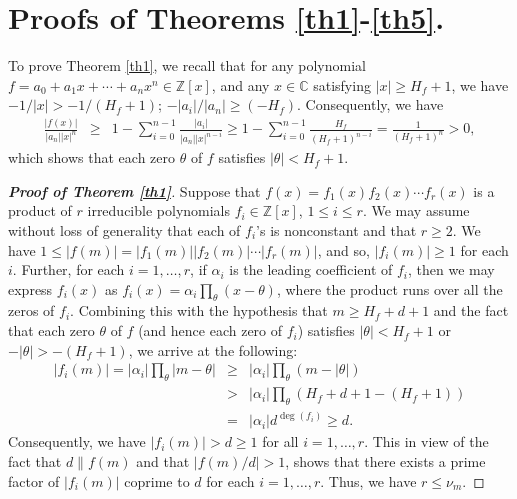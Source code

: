\documentclass[12pt,reqno]{amsart}%
\begin{document}
\section{Proofs of Theorems \ref{th1}-\ref{th5}.}\label{sec:2}
To prove Theorem \ref{th1}, we recall that for any polynomial $f=a_0+a_1x+\cdots +a_nx^n\in \mathbb Z[x]$, and
any $x\in \mathbb{C}$ satisfying $|x|\geq H_f+1$, we have $-1/|x|>-1/(H_f+1)$; $-|a_i|/|a_n|\geq (-H_f)$. Consequently, we have \begin{eqnarray*}
\frac{|f(x)|}{|a_n||x|^n} &\geq &1-\sum_{i=0}^{n-1}\frac{|a_i|}{|a_n||x|^{n-i}}\geq  1-\sum_{i=0}^{n-1}\frac{H_f}{(H_f+1)^{n-i}}=\frac{1}{(H_f+1)^{n}}>0,
\end{eqnarray*}
which shows that each zero $\theta$ of $f$ satisfies $|\theta|<H_f+1$.
 \begin{proof}[\bf Proof of Theorem \ref{th1}] Suppose that $f(x)=f_1(x)f_2(x)\cdots f_r(x)$ is a product of $r$  irreducible polynomials $f_i\in\mathbb Z[x]$, $1\leq i\leq r$. We may assume without loss of generality that each of $f_i$'s is nonconstant and that $r\geq 2$. We  have $1\leq |f(m)|=|f_1(m)||f_2(m)|\cdots |f_r(m)|$, and so, $|f_i(m)|\geq 1$ for each $i$. Further, for each $i=1,\ldots, r$, if $\alpha_i$ is the leading coefficient of $f_i$, then we may express $f_i(x)$ as $f_i(x)=\alpha_i\prod_{\theta}(x-\theta)$, where the product runs over all the zeros of $f_i$. Combining this with the hypothesis that $m\geq H_f+d+1$ and the fact that each  zero $\theta$ of $f$ (and hence each zero of $f_i$) satisfies $|\theta|<H_f +1$ or $-|\theta|>-(H_f+1)$, we arrive at the following:
 \begin{eqnarray*}
 |f_i(m)| = |\alpha_i|\prod_{\theta}|m-\theta|&\geq&  |\alpha_i|\prod_{\theta}(m-|\theta|)\\&>&|\alpha_i|\prod_{\theta}(H_f+d+1-(H_f+1))\\&=&|\alpha_i|d^{\deg(f_i)}\geq d.
 \end{eqnarray*}
Consequently, we have $|f_i(m)|>d\geq 1$ for all $i=1,\ldots,r$. This in view of the fact that $d\| f(m)$ and that $|f(m)/d|>1$, shows that there exists a prime factor  of $|f_i(m)|$ coprime to $d$ for each $i=1,\ldots, r$.  Thus, we have $r\leq \nu_m$.
\end{proof}
\end{document}
